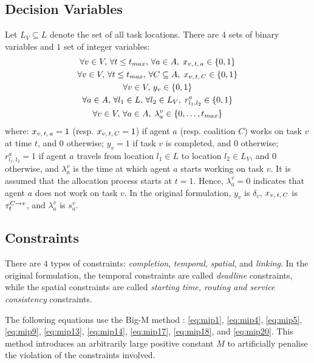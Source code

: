 \subsection{Decision Variables}\label{sec:original-dv}
Let $L_V \subseteq L$ denote the set of all task locations.
There are $4$ sets of binary variables and $1$ set of integer variables:
\begin{gather}
    \forall v \in V,\, \forall t \leq t_{max},\, \forall a \in A,\;
    x_{v,\, t,\, a} \in \left\{ 0, 1 \right\}\\
    \forall v \in V,\, \forall t \leq t_{max},\, \forall C \subseteq A,\;
    x_{v,\, t,\, C} \in \left\{ 0, 1 \right\}\label{eq:dvc}\\
    \forall v \in V,\, y_v \in \left\{ 0, 1 \right\}\\
    \forall a \in A,\, \forall l_1 \in L,\, \forall l_2 \in L_V,\; r^a_{l_1, l_2} \in \left\{ 0, 1 \right\}\\
    \forall v \in V,\, \forall a \in A,\;
    \lambda^v_a \in \left\{ 0, \dots, t_{max} \right\}
\end{gather}
where: $x_{v,\, t,\, a} = 1$ (resp. $x_{v,\, t,\, C} = 1$) if agent $a$ (resp. coalition $C$) works on task $v$
at time $t$, and $0$ otherwise; $y_v = 1$ if task $v$ is completed, and $0$ otherwise;
$r^a_{l_1, l_2} = 1$ if agent $a$ travels from location $l_1 \in L$ to location $l_2 \in
L_V$, and $0$ otherwise, and $\lambda^v_a$ is the time at which agent $a$ starts working
on task $v$.
It is assumed that the allocation process starts at $t = 1$. Hence, $\lambda^v_a = 0$
indicates that agent $a$ does not work on task $v$.
In the original formulation, $y_v$ is
$\delta_v$, $x_{v,\, t,\, C}$ is $\tau^{C \rightarrow v}_{t}$, and $\lambda^v_a$ is $s^v_a$.

\subsection{Constraints}

There are $4$ types of constraints: \emph{completion}, \emph{temporal}, \emph{spatial},
and \emph{linking}. In the original formulation, the temporal constraints are called
\emph{deadline} constraints, while the spatial constraints are called \emph{starting time,
routing and service consistency} constraints.

The following equations use the Big-M method \cite{griva2009}: \ref{eq:mip1},
\ref{eq:mip4}, \ref{eq:mip5}, \ref{eq:mip9}, \ref{eq:mip13}, \ref{eq:mip14},
\ref{eq:mip17}, \ref{eq:mip18}, and \ref{eq:mip20}.
This method introduces an arbitrarily large positive constant $M$ to artificially penalise
the violation of the constraints involved.

